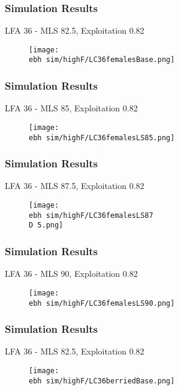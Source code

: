 \documentclass{beamer}
\newcommand{\ebh}{/SpinDr/backup/bio_data/bio.lobster/figures/LFA3438Framework2019/Brad/} %
\newcommand{\D}{.}
\begin{document}
\begin{frame}
\frametitle{Simulation Results}
LFA 36 - MLS 82.5, Exploitation 0.82
\begin{figure}
        \begin{center}
            \texttt{[image: \\ebh sim/highF/LC36femalesBase.png]}
        \end{center}
    \end{figure}
\end{frame}



\begin{frame}
\frametitle{Simulation Results}
LFA 36 - MLS 85, Exploitation 0.82
\begin{figure}
        \begin{center}
            \texttt{[image: \\ebh sim/highF/LC36femalesLS85.png]}
        \end{center}
    \end{figure}
\end{frame}


\begin{frame}
\frametitle{Simulation Results}
LFA 36 - MLS 87.5, Exploitation 0.82
\begin{figure}
        \begin{center}
            \texttt{[image: \\ebh sim/highF/LC36femalesLS87\\D 5.png]}
        \end{center}
    \end{figure}
\end{frame}


\begin{frame}
\frametitle{Simulation Results}
LFA 36 - MLS 90, Exploitation 0.82
\begin{figure}
        \begin{center}
            \texttt{[image: \\ebh sim/highF/LC36femalesLS90.png]}
        \end{center}
    \end{figure}
\end{frame}




\begin{frame}
\frametitle{Simulation Results}
LFA 36 - MLS 82.5, Exploitation 0.82
\begin{figure}
        \begin{center}
            \texttt{[image: \\ebh sim/highF/LC36berriedBase.png]}
        \end{center}
    \end{figure}
\end{frame}
\end{document}
